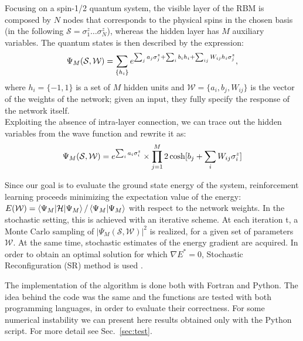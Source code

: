 \documentclass[a4paper,11pt]{article}
\begin{document}
Focusing on a spin-1/2 quantum system, the visible layer of the RBM is composed by $N$ nodes that corresponds to the physical spins in the chosen basis (in the following $\mathcal{S} = \sigma_1^z \dots \sigma_N^z$), whereas the hidden layer has $M$ auxiliary variables. The quantum states is then described by the expression:
\begin{equation}
    \centering
    \Psi_M(\mathcal{S},\mathcal{W})= \sum _{\{h_i\}} e^{\sum _j a_j \sigma_j ^z + \sum _i b_i h_i + \sum _{ij} W_{ij} h_i \sigma_j ^z},
\end{equation}
where $h_i=\{-1,1\}$ is a set of $M$ hidden units and $\mathcal{W}=\{a_i,b_j,W_{ij}\}$ is the vector of the weights of the network; given an input, they fully specify the response of the network itself. 
\\
Exploiting the absence of intra-layer connection, we can trace out the hidden variables from the wave function and rewrite it as:
\begin{equation}
    \label{eq:Psi_M}
    \centering
    \Psi_M(\mathcal{S},\mathcal{W})= e^{\sum _i a_i \sigma_i ^z} \times  \prod _{j=1}^M 2 \cosh [b_j + \sum_i W_{ij} \sigma_i^z ]
\end{equation}

Since our goal is to evaluate the ground state energy of the system, reinforcement learning proceeds minimizing the expectation value of the energy: $E(\mathcal{W})= \braket{\Psi_M | \mathcal{H} | \Psi _M} / \braket{\Psi_M | \Psi_M}$ with respect to the network weights. In the stochastic setting, this is achieved with an iterative scheme. At each iteration t, a Monte Carlo sampling of $|\Psi_M (\mathcal{S}, \mathcal{W})|^2$ is realized, for a given set of parameters $\mathcal{W}$. At the same time, stochastic estimates of the energy gradient are acquired. In order to obtain an optimal solution for which $\nabla E^* = 0$, Stochastic Reconfiguration (SR) method is used \cite{Sorella}.

The implementation of the algorithm is done both with Fortran and Python. The idea behind the code was the same and the functions are tested with both programming languages, in order to evaluate their correctness. For some numerical instability we can present here results obtained only with the Python script. For more detail see Sec.~\ref{sec:test}.

\end{document}
